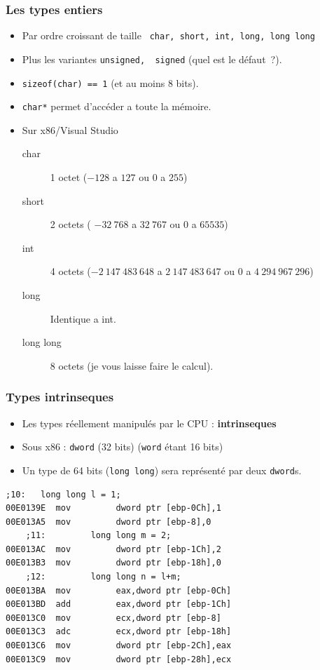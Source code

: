 \documentclass{beamer}
\begin{document}
\begin{frame}
\frametitle{Les types entiers}
\begin{itemize}
\item Par ordre croissant de taille \lstinline+ char, short, int, long, long long+
\item Plus les variantes \lstinline+unsigned,  signed+ (quel est le défaut~?).
\item \lstinline+sizeof(char) == 1+ (et au moins 8 bits).
\item \lstinline+char*+ permet d'accéder a toute la mémoire.
\pause
\item Sur x86/Visual Studio 
\begin{description}
  \item[char] 1 octet ($-128$ a $127$ ou $0$ a $255$)
  \item[short] 2 octets ( $-32~768$ a $32~767$ ou $0$ a $65535$)
  \item[int] 4 octets ($-2~147~483~ 648$ a $2~147~483~ 647$ ou $0$ a $4~294~967~296$)
  \item[long] Identique a int.
  \item[long long] 8 octets (je vous laisse faire le calcul).
\end{description}

\end{itemize}
\end{frame}

\begin{frame}[fragile]
\frametitle{Types intrinseques}

\begin{itemize}
\item Les types réellement manipulés par le CPU : \textbf{intrinseques}
\item Sous x86 : \lstinline[language={[x86masm]Assembler}]+dword+ (32 bits) (\lstinline+word+ étant 16 bits)
\item Un type de 64 bits (\lstinline+long long+) sera représenté par deux \lstinline[language={[x86masm]Assembler}]+dword+s.
\end{itemize}

\begin{lstlisting}[language={[x86masm]Assembler}]
    ;10:   long long l = 1;
00E0139E  mov         dword ptr [ebp-0Ch],1  
00E013A5  mov         dword ptr [ebp-8],0  
    ;11:         long long m = 2;
00E013AC  mov         dword ptr [ebp-1Ch],2  
00E013B3  mov         dword ptr [ebp-18h],0  
    ;12:         long long n = l+m;
00E013BA  mov         eax,dword ptr [ebp-0Ch]  
00E013BD  add         eax,dword ptr [ebp-1Ch]  
00E013C0  mov         ecx,dword ptr [ebp-8]  
00E013C3  adc         ecx,dword ptr [ebp-18h]  
00E013C6  mov         dword ptr [ebp-2Ch],eax  
00E013C9  mov         dword ptr [ebp-28h],ecx 
\end{lstlisting}

\end{frame}
\end{document}
